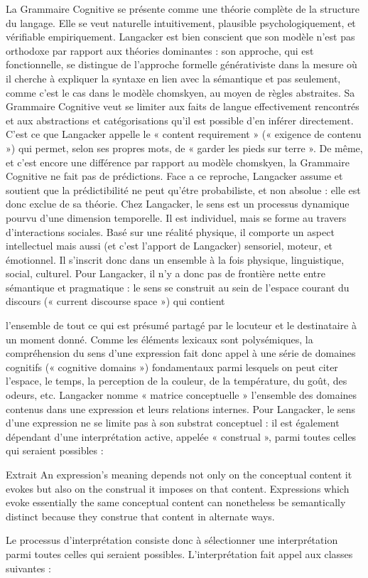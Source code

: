 La Grammaire Cognitive se présente comme une théorie complète de la structure du langage. Elle se veut naturelle intuitivement, plausible psychologiquement, et vérifiable empiriquement. Langacker est bien conscient que son modèle n’est pas orthodoxe par rapport aux théories dominantes : son approche, qui est fonctionnelle, se distingue de l'approche formelle générativiste dans la mesure où il cherche à expliquer la syntaxe en lien avec la sémantique et pas seulement, comme c’est le cas dans le modèle chomskyen, au moyen de règles abstraites. Sa Grammaire Cognitive veut se limiter aux faits de langue effectivement rencontrés et aux abstractions et catégorisations qu’il est possible d’en inférer directement. C’est ce que Langacker appelle le « content requirement » (« exigence de contenu ») qui permet, selon ses propres mots, de « garder les pieds sur terre ». De même, et c’est encore une différence par rapport au modèle chomskyen, la Grammaire Cognitive ne fait pas de prédictions. Face a ce reproche, Langacker assume et soutient que la prédictibilité ne peut qu’étre probabiliste, et non absolue : elle est donc exclue de sa théorie. 
Chez Langacker, le sens est un processus dynamique pourvu d’une dimension temporelle. Il est individuel, mais se forme au travers d'interactions sociales. Basé sur une réalité physique, il comporte un aspect intellectuel mais aussi (et c’est l’apport de Langacker) sensoriel, moteur, et émotionnel. Il s'inscrit donc dans un ensemble à la fois physique, linguistique, social, culturel. Pour Langacker, il n’y a donc pas de frontière nette entre sémantique et pragmatique : le sens se construit au sein de l’espace courant du discours (« current discourse space ») qui contient \par


l’ensemble de tout ce qui est présumé partagé par le locuteur et le destinataire à un moment donné. Comme les éléments lexicaux sont polysémiques, la compréhension du sens d’une expression fait donc appel à une série de domaines cognitifs (« cognitive domains ») fondamentaux parmi lesquels on peut citer l’espace, le temps, la perception de la couleur, de la température, du goût, des odeurs, etc. Langacker nomme « matrice conceptuelle » l’ensemble des domaines contenus dans une expression et leurs relations internes. Pour Langacker, le sens d’une expression ne se limite pas à son substrat conceptuel : il est également dépendant d’une interprétation active, appelée « construal », parmi toutes celles qui seraient possibles : 
\begin{lecture}{Extrait}
An expression’s meaning depends not only on the conceptual content it evokes but also on the construal it imposes on that content. Expressions which evoke essentially the same conceptual content can nonetheless be semantically distinct because they construe that content in alternate ways.
\end{lecture}
 Le processus d’interprétation consiste donc à sélectionner une interprétation parmi toutes celles qui seraient possibles. L'interprétation fait appel aux classes suivantes :\par

